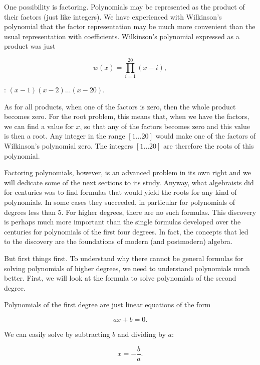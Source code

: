 \documentclass[tikz]{scrreprt}
\begin{document}
One possibility is factoring.
Polynomials may be represented as the product
of their factors (just like integers).
We have experienced with Wilkinson's polynomial
that the factor representation may be much more
convenient than the usual representation with
coefficients. Wilkinson's polynomial expressed
as a product was just

\begin{equation}
w(x) = \prod_{i=1}^{20}{(x-i)},
\end{equation}

\ie: $(x-1)(x-2)\dots (x-20)$.

As for all products, when one of the factors
is zero, then the whole product becomes zero.
For the root problem, this means that, 
when we have the factors, we can find a value
for $x$, so that any of the factors becomes zero
and this value is then a root.
Any integer in the range $[1\dots 20]$ would make
one of the factors of Wilkinson's polynomial zero.
The integers $[1\dots 20]$ are therefore the roots
of this polynomial.

Factoring polynomials, however, is an advanced
problem in its own right and we will dedicate
some of the next sections to its study. Anyway, what
algebraists did for centuries was to find
formulas that would yield the roots for any kind
of polynomials. In some cases they succeeded,
in particular for polynomials of degrees less
than 5. For higher degrees, there are no such
formulas. This discovery is perhaps much more
important than the single formulas developed
over the centuries for polynomials of the first
four degrees. In fact, the concepts that led
to the discovery are the foundations of modern
(and postmodern) algebra. 

But first things first. To understand why there
cannot be general formulas for solving polynomials
of higher degrees, we need to understand polynomials
much better. First, we will look at the formula
to solve polynomials of the second degree.

Polynomials of the first degree are just 
linear equations of the form

\begin{equation}
ax + b = 0.
\end{equation}

We can easily solve by subtracting $b$ and dividing
by $a$:

\begin{equation}
x = -\frac{b}{a}.
\end{equation}
\end{document}
